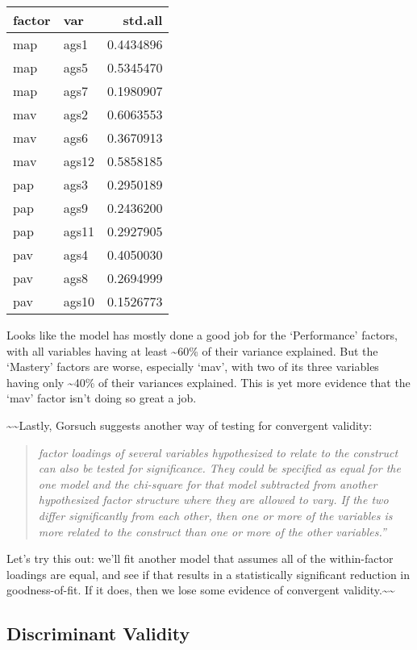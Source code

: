 \documentclass[
  letterpaper,
  DIV=11,
  numbers=noendperiod]{scrreprt}
\begin{document}
\begin{longtable}[]{@{}llr@{}}
\toprule()
factor & var & std.all \\
\midrule()
\endhead
map & ags1 & 0.4434896 \\
map & ags5 & 0.5345470 \\
map & ags7 & 0.1980907 \\
mav & ags2 & 0.6063553 \\
mav & ags6 & 0.3670913 \\
mav & ags12 & 0.5858185 \\
pap & ags3 & 0.2950189 \\
pap & ags9 & 0.2436200 \\
pap & ags11 & 0.2927905 \\
pav & ags4 & 0.4050030 \\
pav & ags8 & 0.2694999 \\
pav & ags10 & 0.1526773 \\
\bottomrule()
\end{longtable}

Looks like the model has mostly done a good job for the `Performance'
factors, with all variables having at least \textasciitilde60\% of their
variance explained. But the `Mastery' factors are worse, especially
`mav', with two of its three variables having only \textasciitilde40\%
of their variances explained. This is yet more evidence that the `mav'
factor isn't doing so great a job.

\textasciitilde\textasciitilde Lastly, Gorsuch suggests another way of
testing for convergent validity:

\begin{quote}
\emph{factor loadings of several variables hypothesized to relate to the
construct can also be tested for significance. They could be specified
as equal for the one model and the chi-square for that model subtracted
from another hypothesized factor structure where they are allowed to
vary. If the two differ significantly from each other, then one or more
of the variables is more related to the construct than one or more of
the other variables.''}
\end{quote}

Let's try this out: we'll fit another model that assumes all of the
within-factor loadings are equal, and see if that results in a
statistically significant reduction in goodness-of-fit. If it does, then
we lose some evidence of convergent
validity.\textasciitilde\textasciitilde{}

\hypertarget{discriminant-validity}{%
\subsection*{Discriminant Validity}\label{discriminant-validity}}
\end{document}
